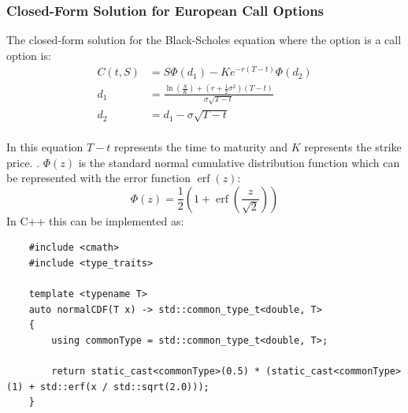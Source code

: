 \documentclass[12pt]{article}
\numberwithin{equation}{section}
\begin{document}
 \subsubsection{Closed-Form Solution for European Call Options}
 The closed-form solution for the Black-Scholes equation where the option is a call option is: 
 \begin{equation}
 \begin{aligned}
 	C(t,S) &= S\Phi(d_1) - Ke^{-r(T-t)}\Phi(d_2) \\
 	d_1 &= \frac{\ln(\frac{S}{K}) + (r + \frac{1}{2}\sigma^2)(T-t)}{\sigma\sqrt{T-t}} \\ 
 	 d_2 &= d_1 - \sigma\sqrt{T-t} \\ 
 \end{aligned}
 \label{eq:2.2}
\end{equation}

  In this equation $T-t$ represents the time to maturity and $K$ represents the strike price. \cite{haugh2016BlackScholes}. \newline \newline
  $\Phi(z)$ is the standard normal cumulative distribution function which can be represented with the error function $\operatorname{erf}(z)$: 
  \begin{equation}
  	\Phi(z) = \frac{1}{2}(1 + \operatorname{erf}(\frac{z}{\sqrt{2}}))
  	\label{eq:2.3}
  \end{equation}
 \newline In C++ this can be implemented as:
  
\begin{listing}[ht]
	\begin{verbatim}
	#include <cmath>
	#include <type_traits>
		
	template <typename T>
	auto normalCDF(T x) -> std::common_type_t<double, T>
	{
		using commonType = std::common_type_t<double, T>;
			
		return static_cast<commonType>(0.5) * (static_cast<commonType>(1) + std::erf(x / std::sqrt(2.0)));
	}
	\end{verbatim}
	\caption{Normal cumulative distribution function}
	\label{lst:normal-cdf}
\end{listing}
\end{document}
